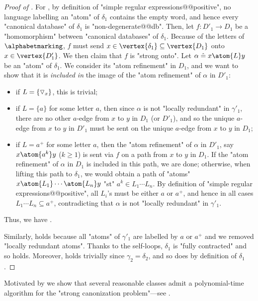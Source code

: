\begin{proof}[Proof of ]
	For \axiomStrongCanonCore{}, by definition of "simple regular expressions@@positive",
	no language labelling an "atom" of $\delta_1$ contains the empty word, and hence
	every "canonical database" of $\delta_1$ is "non-degenerate@@db".
	Then, let $f\colon D'_1 \to D_1$ be a "homomorphism" between "canonical databases"
	of $\delta_1$. Because of the letters of $\alphabetmarking$,
	$f$ must send $x \in \vertex{\delta_1} \subseteq \vertex{D_1}$
	onto $x \in \vertex{D'_1}$. We then claim that $f$ is "strong onto".
	Let $\alpha \defeq x \atom{L} y$ be an "atom" of $\delta_1$.
	We consider its "atom refinement" in $D_1$, and we want to show that it is
	\emph{included in} the image of the "atom refinement" of $\alpha$ in $D'_1$:
	\begin{itemize}
		\item if $L = \{\triangledown_x\}$, this is trivial;
		\item if $L = \{a\}$ for some letter $a$, then since
			$\alpha$ is not "locally redundant" in $\gamma'_1$,
			there are no other $a$-edge from $x$ to $y$ in $D_1$ (or $D'_1$),
			and so the unique $a$-edge from $x$ to $y$ in $D'_1$
			must be sent on the unique $a$-edge from $x$ to $y$ in $D_1$;
		\item if $L = a^+$ for some letter $a$, then the "atom refinement" of $\alpha$ in
			$D'_1$, say $x \atom{a^k} y$ ($k \geq 1$) is sent via $f$ on a path
			from $x$ to $y$ in $D_1$. If the "atom refinement" of $\alpha$ in $D_1$
			is included in this path, we are done; otherwise, when lifting
			this path to $\delta_1$, we would obtain a path of "atoms"
			$x \atom{L_1} \cdots \atom{L_n} y$ "st" $a^k \in L_1\cdots L_n$.
			By definition of "simple regular expressions@@positive", all $L_i$'s must
			be either $a$ or $a^+$, and hence in all cases $L_1 \cdots L_n \subseteq a^+$,
			contradicting that $\alpha$ is not "locally redundant" in $\gamma'_1$. 
	\end{itemize}
	Thus, we have \axiomStrongCanonCore{}.

	Similarly, \axiomCanonNonRed{} holds because all "atoms" of $\gamma'_1$ are labelled
	by $a$ or $a^+$ and we removed "locally redundant atoms".
	Thanks to the self-loops, $\delta_1$ is "fully contracted" and so \axiomCanonContracted{} holds.
	Moreover, \axiomCanonContainment{} holds trivially since $\gamma_2 = \delta_2$,
	and so does \axiomCanonMarking{} by definition of $\delta_1$.
\end{proof}

Motivated by 
we show that several reasonable classes admit
a polynomial-time algorithm for the "strong canonization problem"---see
.

